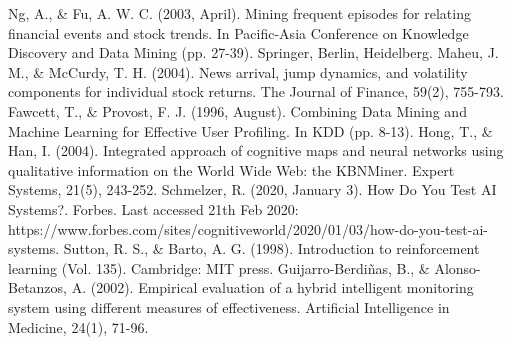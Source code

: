 \documentclass[a4paper,12pt]{report}
\begin{document}
\begin{thebibliography}{9}
	Ng, A., \& Fu, A. W. C. (2003, April). Mining frequent episodes for relating financial events and stock trends. In Pacific-Asia Conference on Knowledge Discovery and Data Mining (pp. 27-39). Springer, Berlin, Heidelberg.
	Maheu, J. M., \& McCurdy, T. H. (2004). News arrival, jump dynamics, and volatility components for individual stock returns. The Journal of Finance, 59(2), 755-793.
	Fawcett, T., \& Provost, F. J. (1996, August). Combining Data Mining and Machine Learning for Effective User Profiling. In KDD (pp. 8-13).
	Hong, T., \& Han, I. (2004). Integrated approach of cognitive maps and neural networks using qualitative information on the World Wide Web: the KBNMiner. Expert Systems, 21(5), 243-252.
	Schmelzer, R. (2020, January 3). How Do You Test AI Systems?. Forbes. Last accessed 21th Feb 2020: https://www.forbes.com/sites/cognitiveworld/2020/01/03/how-do-you-test-ai-systems.
	Sutton, R. S., \& Barto, A. G. (1998). Introduction to reinforcement learning (Vol. 135). Cambridge: MIT press.
	\bibitem{}
	Guijarro-Berdiñas, B., \& Alonso-Betanzos, A. (2002). Empirical evaluation of a hybrid intelligent monitoring system using different measures of effectiveness. Artificial Intelligence in Medicine, 24(1), 71-96.
\end{thebibliography}
\end{document}
